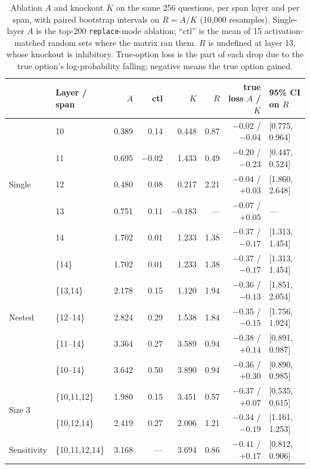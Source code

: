 \documentclass[11pt,a4paper]{article}
\begin{document}
\begin{table}[h]
  \centering
  \caption{Ablation $A$ and knockout $K$ on the same 256 questions, per span
  layer and per span, with paired bootstrap intervals on $R = A/K$ (10{,}000
  resamples). Single-layer $A$ is the top-200 \texttt{replace}-mode ablation;
  ``ctl'' is the mean of 15 activation-matched random sets where the matrix ran
  them. $R$ is undefined at layer 13, whose knockout is inhibitory. True-option
  loss is the part of each drop due to the true option's log-probability
  falling; negative means the true option gained.}
  \label{tab:llava16-spans}
  \small
  \begin{tabular}{llrrrrrl}
    \toprule
    & Layer / span & $A$ & ctl & $K$ & $R$ & true loss $A$ / $K$ & 95\% CI on $R$ \\
    \midrule
    \multirow{5}{*}{Single}
      & 10 & 0.389 & 0.14 &  0.448 & 0.87 & $-0.02$ / $-0.04$ & [0.775, 0.964] \\
      & 11 & 0.695 & $-0.02$ & 1.433 & 0.49 & $-0.20$ / $-0.23$ & [0.447, 0.524] \\
      & 12 & 0.480 & 0.08 &  0.217 & 2.21 & $-0.04$ / $+0.03$ & [1.860, 2.648] \\
      & 13 & 0.751 & 0.11 & $-0.183$ & --- & $-0.07$ / $+0.05$ & --- \\
      & 14 & 1.702 & 0.01 &  1.233 & 1.38 & $-0.37$ / $-0.17$ & [1.313, 1.454] \\
    \midrule
    \multirow{5}{*}{Nested}
      & \{14\}     & 1.702 & 0.01 & 1.233 & 1.38 & $-0.37$ / $-0.17$ & [1.313, 1.454] \\
      & \{13,14\}  & 2.178 & 0.15 & 1.120 & 1.94 & $-0.36$ / $-0.13$ & [1.851, 2.054] \\
      & \{12--14\} & 2.824 & 0.29 & 1.538 & 1.84 & $-0.35$ / $-0.15$ & [1.756, 1.924] \\
      & \{11--14\} & 3.364 & 0.27 & 3.589 & 0.94 & $-0.38$ / $+0.14$ & [0.891, 0.987] \\
      & \{10--14\} & 3.642 & 0.50 & 3.890 & 0.94 & $-0.36$ / $+0.30$ & [0.890, 0.985] \\
    \midrule
    \multirow{2}{*}{Size 3}
      & \{10,11,12\} & 1.980 & 0.15 & 3.451 & 0.57 & $-0.37$ / $+0.07$ & [0.535, 0.615] \\
      & \{10,12,14\} & 2.419 & 0.27 & 2.006 & 1.21 & $-0.34$ / $-0.19$ & [1.161, 1.253] \\
    \midrule
    Sensitivity & \{10,11,12,14\} & 3.168 & --- & 3.694 & 0.86 & $-0.41$ / $+0.17$ & [0.812, 0.906] \\
    \bottomrule
  \end{tabular}
\end{table}
\end{document}
